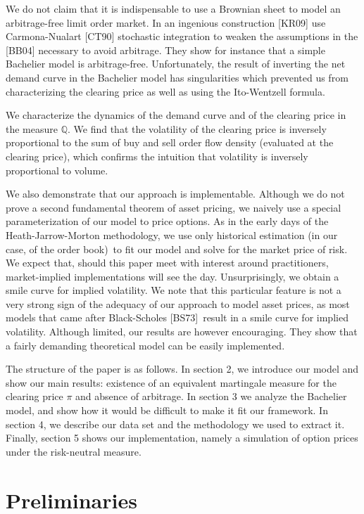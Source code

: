 \documentclass{article}
\begin{document}
We do not claim that it is indispensable to use a Brownian sheet to model an
arbitrage-free limit order market. In an ingenious construction [KR09] use
Carmona-Nualart [CT90] stochastic integration to weaken the assumptions in
the [BB04] necessary to avoid arbitrage. They show for instance that a
simple Bachelier model is arbitrage-free. Unfortunately, the result of
inverting the net demand curve in the Bachelier model has singularities
which prevented us from characterizing the clearing price as well as using
the Ito-Wentzell formula.

We characterize the dynamics of the demand curve and of the clearing price
in the measure $\mathbb{Q}$. We find that the volatility of the clearing
price is inversely proportional to the sum of buy and sell order flow
density (evaluated at the clearing price), which confirms the intuition that
volatility is inversely proportional to volume.

We also demonstrate that our approach is implementable. Although we do not
prove a second fundamental theorem of asset pricing, we naively use a
special parameterization of our model to price options. As in the early days
of the Heath-Jarrow-Morton methodology, we use only historical estimation
(in our case, of the order book)\ to fit our model and solve for the market
price of risk. We expect that, should this paper meet with interest around
practitioners, market-implied implementations will see the day.
Unsurprisingly, we obtain a smile curve for implied volatility. We note that
this particular feature is not a very strong sign of the adequacy of our
approach to model asset prices, as most models that came after Black-Scholes
[BS73]\ result in a smile curve for implied volatility. Although limited,
our results are however encouraging. They show that a fairly demanding
theoretical model can be easily implemented.

The structure of the paper is as follows. In section 2, we introduce our
model and show our main results: existence of an equivalent martingale
measure for the clearing price $\pi $ and absence of arbitrage. In section 3
we analyze the Bachelier model, and show how it would be difficult to make
it fit our framework. In section 4, we describe our data set and the
methodology we used to extract it. Finally, section 5 shows our
implementation, namely a simulation of option prices under the risk-neutral
measure.

\section{Preliminaries}
\end{document}
